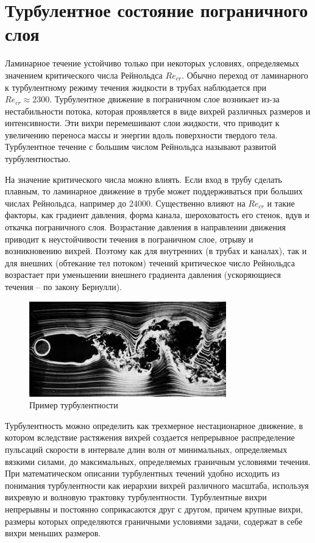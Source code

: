 \section{Турбулентное состояние пограничного слоя}
	Ламинарное течение устойчиво только при некоторых условиях, определяемых значением критического числа Рейнольдса $Re_{cr}$. Обычно переход от ламинарного к турбулентному режиму течения жидкости в трубах наблюдается при $Re_{cr} \approx 2300$. Турбулентное движение в пограничном слое возникает из-за нестабильности потока, которая проявляется в виде вихрей различных размеров и интенсивности. Эти вихри перемешивают слои жидкости, что приводит к увеличению переноса массы и энергии вдоль поверхности твердого тела. Турбулентное течение с большим числом Рейнольдса называют развитой турбулентностью.
	
	На значение критического числа можно влиять. Если вход в трубу сделать плавным, то ламинарное движение в трубе может поддерживаться при больших числах Рейнольдса, например до 24000. Существенно влияют на $Re_{cr}$ и такие факторы, как градиент давления, форма канала, шероховатость его стенок, вдув и откачка пограничного слоя. Возрастание давления в направлении движения приводит к неустойчивости течения в пограничном слое, отрыву и возникновению вихрей. Поэтому как для внутренних (в трубах и каналах), так и для внешних (обтекание тел потоком) течений критическое число Рейнольдса возрастает при уменьшении внешнего градиента давления (ускоряющиеся течения -- по закону Бернулли).
	\begin{figure}[H]
		\centering
		\includegraphics[width=0.7\linewidth]{../Assets/turb}
		\caption{Пример турбулентности}
		\label{fig:turb}
	\end{figure}

	Турбулентность можно определить как трехмерное нестационарное движение, в котором вследствие растяжения вихрей создается непрерывное распределение пульсаций скорости в интервале длин волн от минимальных, определяемых вязкими силами, до максимальных, определяемых граничным условиями течения. При математическом описании турбулентных течений удобно исходить из понимания турбулентности как иерархии вихрей различного масштаба, используя вихревую и волновую трактовку турбулентности\cite{Монин1992}. Турбулентные вихри непрерывны и постоянно соприкасаются друг с другом, причем крупные вихри, размеры которых определяются граничными условиями задачи, содержат в себе вихри меньших размеров.
	
